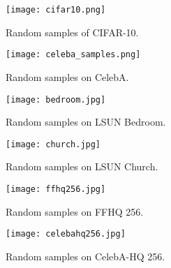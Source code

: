 \documentclass[nohyperref]{article}
\theoremstyle{plain}
\theoremstyle{definition}
\theoremstyle{remark}
\begin{document}
	\begin{figure}[t]
		\centering
		\texttt{[image: cifar10.png]}
		\caption{Random samples of CIFAR-10.}
		\label{fig:cifar10}
	\end{figure}
	
	\begin{figure}[t]
		\centering
		\texttt{[image: celeba\_samples.png]}
		\caption{Random samples on CelebA.}
		\label{fig:celeba}
	\end{figure}
	
	\begin{figure}[t]
		\centering
		\texttt{[image: bedroom.jpg]}
		\caption{Random samples on LSUN Bedroom.}
		\label{fig:bedroom}
	\end{figure}
	
	\begin{figure}[t]
		\centering
		\texttt{[image: church.jpg]}
		\caption{Random samples on LSUN Church.}
		\label{fig:church}
	\end{figure}
	
	\begin{figure}[t]
		\centering
		\texttt{[image: ffhq256.jpg]}
		\caption{Random samples on FFHQ 256.}
		\label{fig:ffhq256}
	\end{figure}
	
	\begin{figure}[t]
		\centering
		\texttt{[image: celebahq256.jpg]}
		\caption{Random samples on CelebA-HQ 256.}
		\label{fig:celebahq256}
	\end{figure}
\end{document}

